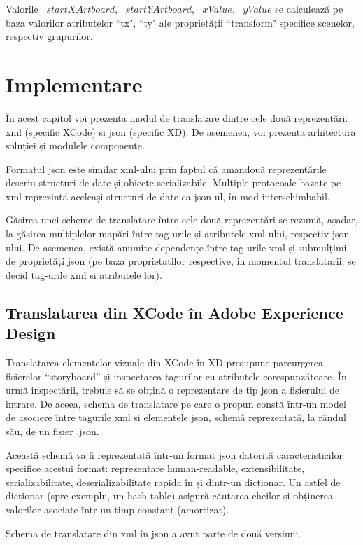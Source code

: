 Valorile ~$startXArtboard$, ~$startYArtboard$, ~$xValue$, ~$yValue$ se calculează pe baza valorilor atributelor ``tx", ``ty" ale proprietății ``transform" specifice scenelor, respectiv grupurilor.

\chapter{Implementare}

În acest capitol voi prezenta modul de translatare dintre cele două reprezentări: xml (specific XCode) și json (specific XD). De asemenea, voi prezenta arhitectura soluției și modulele componente.

Formatul json este similar xml-ului prin faptul că amandouă reprezentările descriu structuri de date și obiecte serializabile. Multiple protocoale bazate pe xml reprezintă aceleași structuri de date ca json-ul, în mod interschimbabil.

Găsirea unei scheme de translatare între cele două reprezentări se rezumă, așadar, la găsirea multiplelor mapări între tag-urile și atributele xml-ului, respectiv json-ului. De asemenea, există anumite dependențe între tag-urile xml și submulțimi de proprietăți json (pe baza proprietatilor respective, in momentul translatarii, se decid tag-urile xml si atributele lor).

\section{Translatarea din XCode în Adobe Experience Design}

Translatarea elementelor vizuale din XCode în XD presupune parcurgerea fișierelor “storyboard” și inspectarea tagurilor cu atributele corespunzătoare. În urmă inspectării, trebuie să se obțină o reprezentare de tip json a fișierului de intrare.  De aceea, schema de translatare pe care o propun constă într-un model de asociere între tagurile xml și elementele json, schemă reprezentată, la rândul său, de un fișier .json.  

Această schemă va fi reprezentată într-un format json datorită caracteristicilor specifice acestui format: reprezentare human-readable, extensibilitate, serializabilitate, deserializabilitate rapidă în și dintr-un dicționar. Un astfel de dicționar (spre exemplu, un hash table) asigură căutarea cheilor și obținerea valorilor asociate într-un timp constant (amortizat).

Schema de translatare din xml în json a avut parte de două versiuni. 

